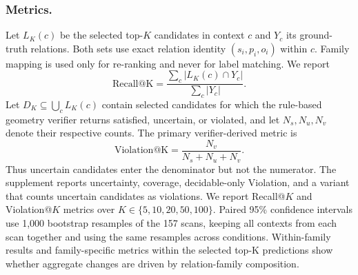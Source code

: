 \subsubsection{Metrics.}
Let $L_K(c)$ be the selected top-$K$ candidates in context $c$ and $Y_c$ its ground-truth relations. Both sets use exact relation identity $(s_i,p_i,o_i)$ within $c$. Family mapping is used only for re-ranking and never for label matching. We report
\begin{equation}
\mathrm{Recall@K}=\frac{\sum_c |L_K(c)\cap Y_c|}{\sum_c |Y_c|}.
\end{equation}
Let $D_K\subseteq\bigcup_c L_K(c)$ contain selected candidates for which the rule-based geometry verifier returns satisfied, uncertain, or violated, and let $N_s,N_u,N_v$ denote their respective counts. The primary verifier-derived metric is
\begin{equation}
\mathrm{Violation@K}=\frac{N_v}{N_s+N_u+N_v}.
\end{equation}
Thus uncertain candidates enter the denominator but not the numerator. 
The supplement reports uncertainty, coverage, decidable-only Violation, and a variant that counts uncertain candidates as violations.
We report Recall@$K$ and Violation@$K$ metrics over $K \in \{5, 10, 20, 50, 100\}$. Paired 95\% confidence intervals use 1,000 bootstrap resamples of the 157 scans, keeping all contexts from each scan together and using the same resamples across conditions. Within-family results and family-specific metrics within the selected top-K predictions show whether aggregate changes are driven by relation-family composition.

